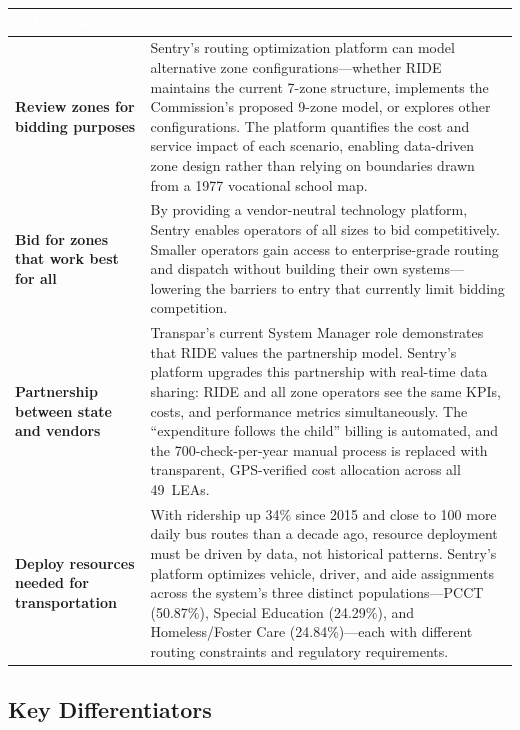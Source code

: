 \begin{longtable}{|p{4cm}|p{10cm}|}
\hline
\rowcolor{tableHeader}
\textcolor{white}{\textbf{RIDE Goal}} &
\textcolor{white}{\textbf{Sentry's Alignment}} \\
\hline
\endfirsthead

\textbf{Review zones for bidding purposes} & Sentry's routing optimization platform can model alternative zone configurations---whether RIDE maintains the current 7-zone structure, implements the Commission's proposed 9-zone model, or explores other configurations. The platform quantifies the cost and service impact of each scenario, enabling data-driven zone design rather than relying on boundaries drawn from a 1977 vocational school map. \\ \hline

\textbf{Bid for zones that work best for all} & By providing a vendor-neutral technology platform, Sentry enables operators of all sizes to bid competitively. Smaller operators gain access to enterprise-grade routing and dispatch without building their own systems---lowering the barriers to entry that currently limit bidding competition. \\ \hline

\textbf{Partnership between state and vendors} & Transpar's current System Manager role demonstrates that RIDE values the partnership model. Sentry's platform upgrades this partnership with real-time data sharing: RIDE and all zone operators see the same KPIs, costs, and performance metrics simultaneously. The ``expenditure follows the child'' billing is automated, and the 700-check-per-year manual process is replaced with transparent, GPS-verified cost allocation across all 49~LEAs. \\ \hline

\textbf{Deploy resources needed for transportation} & With ridership up 34\% since 2015 and close to 100 more daily bus routes than a decade ago, resource deployment must be driven by data, not historical patterns. Sentry's platform optimizes vehicle, driver, and aide assignments across the system's three distinct populations---PCCT (50.87\%), Special Education (24.29\%), and Homeless/Foster Care (24.84\%)---each with different routing constraints and regulatory requirements. \\ \hline
\end{longtable}

\subsection{Key Differentiators}

